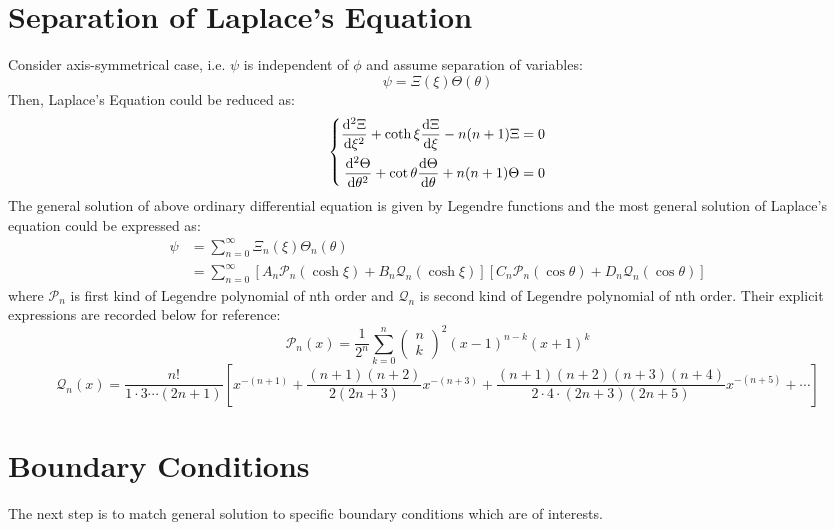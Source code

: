 \documentclass[fontsize=11pt, %
                             paper=a4, %
                             twoside, %
                             captions=tableheading,
                             index=totoc,
                             hyperref]{labbook}
\begin{document}
\section{Separation of Laplace's Equation}
Consider axis-symmetrical case, i.e. $\psi$ is independent of $\phi$ and assume separation of variables:
\begin{equation}
\psi=\Xi(\xi)\Theta(\theta)
\end{equation}
Then, Laplace's Equation could be reduced as:
\begin{equation}
\left\{
\begin{aligned}
\frac{\mathrm{d}^2 \Xi}{\mathrm{d} \xi^2}+\coth\xi\frac{\mathrm{d} \Xi}{\mathrm{d} \xi}-n(n+1)\Xi&=0\\
\frac{\mathrm{d}^2 \Theta}{\mathrm{d} \theta^2}+\cot\theta\frac{\mathrm{d} \Theta}{\mathrm{d} \theta}+n(n+1)\Theta&=0
\end{aligned}
\right.
\end{equation}
The general solution of above ordinary differential equation is given by Legendre functions and the most general solution of Laplace's equation could be expressed as\cite{MoonSpencer1988}:
\begin{equation}
\begin{aligned}
\psi&=\sum_{n=0}^\infty \Xi_n(\xi)\Theta_n(\theta)\\
&=\sum_{n=0}^\infty \left[A_n \mathscr{P}_n(\cosh\xi)+B_n \mathscr{Q}_n(\cosh\xi)\right]\left[C_n\mathscr{P}_n(\cos\theta)+D_n\mathscr{Q}_n(\cos\theta)\right]
\end{aligned}
\end{equation}
where $\mathscr{P}_n$ is first kind of Legendre polynomial of nth order and $\mathscr{Q}_n$ is second kind of Legendre polynomial of nth order. Their explicit expressions are recorded below for reference:
\begin{equation}
\mathscr{P}_n(x)=\frac{1}{2^n}\sum_{k=0}^n
\begin{pmatrix}
n\\
k
\end{pmatrix}^2
(x-1)^{n-k}(x+1)^k
\end{equation}
\begin{equation}
\mathscr{Q}_n(x)=\frac{n!}{1\cdot3\cdots(2n+1)}\left[x^{-(n+1)}+\frac{(n+1)(n+2)}{2(2n+3)}x^{-(n+3)}+\frac{(n+1)(n+2)(n+3)(n+4)}{2\cdot4\cdot(2n+3)(2n+5)}x^{-(n+5)}+\cdots\right]
\end{equation}
\section{Boundary Conditions}
The next step is to match general solution to specific boundary conditions which are of interests.
\end{document}
